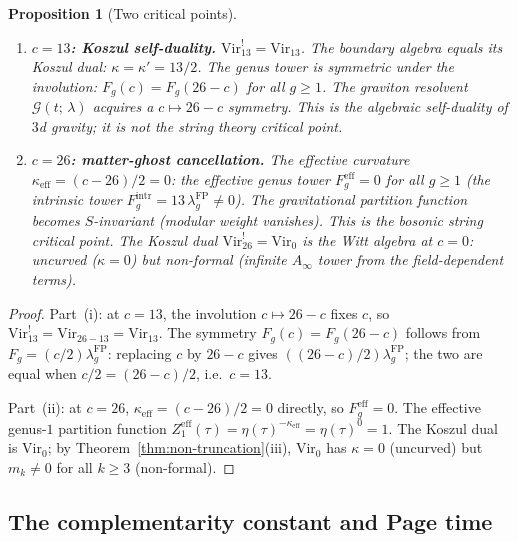 \documentclass[11pt,reqno]{amsart}
\newtheorem{proposition}[theorem]{Proposition}
\theoremstyle{definition}
\theoremstyle{remark}
\begin{document}
\begin{proposition}[Two critical points]
\label{prop:critical-points}
\mbox{}
\begin{enumerate}[label=\textup{(\roman*)}]
\item \textbf{$c = 13$: Koszul self-duality.}
  $\mathrm{Vir}_{13}^! = \mathrm{Vir}_{13}$. The boundary algebra
  equals its Koszul dual: $\kappa = \kappa' = 13/2$. The genus tower
  is symmetric under the involution: $F_g(c) = F_g(26-c)$ for all
  $g \ge 1$. The graviton resolvent
  $\mathcal{G}(t;\,\lambda)$ acquires a $c \mapsto 26-c$ symmetry.
  This is the algebraic self-duality of $3$d gravity; it is
  \emph{not} the string theory critical point.
\item \textbf{$c = 26$: matter-ghost cancellation.}
  The effective curvature
  $\kappa_{\mathrm{eff}} = (c-26)/2 = 0$: the effective genus tower
  $F_g^{\mathrm{eff}} = 0$ for all $g \ge 1$ (the intrinsic tower
  $F_g^{\mathrm{intr}} = 13\,\lambda_g^{\mathrm{FP}} \ne 0$). The
  gravitational partition function becomes $S$-invariant (modular
  weight vanishes). This is the bosonic string critical point. The
  Koszul dual $\mathrm{Vir}_{26}^! = \mathrm{Vir}_0$ is the Witt
  algebra at $c = 0$: uncurved ($\kappa = 0$) but non-formal
  (infinite $A_\infty$ tower from the field-dependent terms).
\end{enumerate}
\end{proposition}

\begin{proof}
Part~(i): at $c = 13$, the involution $c \mapsto 26 - c$ fixes
$c$, so $\mathrm{Vir}_{13}^! = \mathrm{Vir}_{26-13}
= \mathrm{Vir}_{13}$. The symmetry $F_g(c) = F_g(26-c)$ follows
from $F_g = (c/2)\lambda_g^{\mathrm{FP}}$: replacing $c$ by
$26-c$ gives $((26-c)/2)\lambda_g^{\mathrm{FP}}$; the two are
equal when $c/2 = (26-c)/2$, i.e.\ $c = 13$.

Part~(ii): at $c = 26$, $\kappa_{\mathrm{eff}} = (c-26)/2 = 0$
directly, so $F_g^{\mathrm{eff}} = 0$. The effective genus-$1$
partition function
$Z_1^{\mathrm{eff}}(\tau) = \eta(\tau)^{-\kappa_{\mathrm{eff}}}
= \eta(\tau)^0 = 1$. The Koszul dual is
$\mathrm{Vir}_0$; by Theorem~\ref{thm:non-truncation}(iii),
$\mathrm{Vir}_0$ has $\kappa = 0$ (uncurved) but $m_k \ne 0$ for all
$k \ge 3$ (non-formal).
\end{proof}

\subsection{The complementarity constant and Page time}
\end{document}
